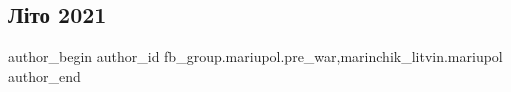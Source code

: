  
 
 
 
 

\subsection{Літо 2021}
\label{sec:26_02_2023.fb.fb_group.mariupol.pre_war.2.l_to_2021}
 
\ifcmt
 author_begin
   author_id fb_group.mariupol.pre_war,marinchik_litvin.mariupol
 author_end
\fi
